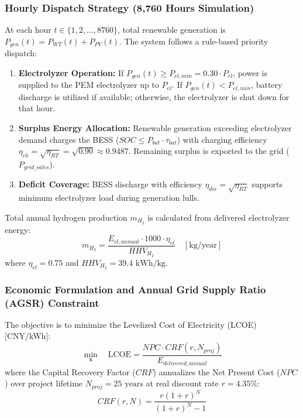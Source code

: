 \subsubsection{Hourly Dispatch Strategy (8,760 Hours Simulation)}

At each hour $t \in \{1, 2, \dots, 8760\}$, total renewable generation is $P_{gen}(t) = P_{WT}(t) + P_{PV}(t)$. The system follows a rule-based priority dispatch:
\begin{enumerate}
    \item \textbf{Electrolyzer Operation:} If $P_{gen}(t) \ge P_{el,min} = 0.30 \cdot P_{el}$, power is supplied to the PEM electrolyzer up to $P_{el}$. If $P_{gen}(t) < P_{el,min}$, battery discharge is utilized if available; otherwise, the electrolyzer is shut down for that hour.
    \item \textbf{Surplus Energy Allocation:} Renewable generation exceeding electrolyzer demand charges the BESS ($SOC \le P_{bat} \cdot \tau_{bat}$) with charging efficiency $\eta_{ch} = \sqrt{\eta_{RT}} = \sqrt{0.90} \approx 0.9487$. Remaining surplus is exported to the grid ($P_{grid\_sales}$).
    \item \textbf{Deficit Coverage:} BESS discharge with efficiency $\eta_{dis} = \sqrt{\eta_{RT}}$ supports minimum electrolyzer load during generation lulls.
\end{enumerate}

Total annual hydrogen production $m_{H_2}$ is calculated from delivered electrolyzer energy:
\begin{equation}
m_{H_2} = \frac{E_{el,annual} \cdot 1000 \cdot \eta_{el}}{HHV_{H_2}} \quad [\text{kg/year}]
\label{eq:h2_production}
\end{equation}
where $\eta_{el} = 0.75$ and $HHV_{H_2} = 39.4\text{ kWh/kg}$.



\subsubsection{Economic Formulation and Annual Grid Supply Ratio (AGSR) Constraint}

The objective is to minimize the Levelized Cost of Electricity (LCOE) [CNY/kWh]:
\begin{equation}
\min_{\mathbf{x}} \quad \text{LCOE} = \frac{NPC \cdot CRF(r, N_{proj})}{E_{delivered,annual}}
\label{eq:lcoe_obj}
\end{equation}
where the Capital Recovery Factor ($CRF$) annualizes the Net Present Cost ($NPC$) over project lifetime $N_{proj} = 25\text{ years}$ at real discount rate $r = 4.35\%$:
\begin{equation}
CRF(r, N) = \frac{r(1+r)^N}{(1+r)^N - 1}
\label{eq:crf_factor}
\end{equation}

